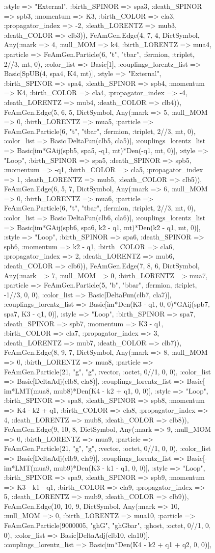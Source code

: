\documentclass{revtex4}
\begin{document}
\begin{figure}[!htb]
\begin{center}
{:style => "External", :birth_SPINOR => spa3, :death_SPINOR => spb3, :momentum => K3, :birth_COLOR => cla3, :propagator_index => -2, :death_LORENTZ => mub3, :death_COLOR => clb3)), FeAmGen.Edge(4, 7, 4, Dict{Symbol, Any}(:mark => 4, :null_MOM => k4, :birth_LORENTZ => mua4, :particle => FeAmGen.Particle(6, "t", "tbar", :fermion, :triplet, 2//3, mt, 0), :color_list => Basic[1], :couplings_lorentz_list => Basic[SpUB(4, spa4, K4, mt)], :style => "External", :birth_SPINOR => spa4, :death_SPINOR => spb4, :momentum => K4, :birth_COLOR => cla4, :propagator_index => -4, :death_LORENTZ => mub4, :death_COLOR => clb4)), FeAmGen.Edge(5, 6, 5, Dict{Symbol, Any}(:mark => 5, :null_MOM => 0, :birth_LORENTZ => mua5, :particle => FeAmGen.Particle(6, "t", "tbar", :fermion, :triplet, 2//3, mt, 0), :color_list => Basic[DeltaFun(clb5, cla5)], :couplings_lorentz_list => Basic[im*GAij(spb5, spa5, -q1, mt)*Den(-q1, mt, 0)], :style => "Loop", :birth_SPINOR => spa5, :death_SPINOR => spb5, :momentum => -q1, :birth_COLOR => cla5, :propagator_index => 1, :death_LORENTZ => mub5, :death_COLOR => clb5)), FeAmGen.Edge(6, 5, 7, Dict{Symbol, Any}(:mark => 6, :null_MOM => 0, :birth_LORENTZ => mua6, :particle => FeAmGen.Particle(6, "t", "tbar", :fermion, :triplet, 2//3, mt, 0), :color_list => Basic[DeltaFun(clb6, cla6)], :couplings_lorentz_list => Basic[im*GAij(spb6, spa6, k2 - q1, mt)*Den(k2 - q1, mt, 0)], :style => "Loop", :birth_SPINOR => spa6, :death_SPINOR => spb6, :momentum => k2 - q1, :birth_COLOR => cla6, :propagator_index => 2, :death_LORENTZ => mub6, :death_COLOR => clb6)), FeAmGen.Edge(7, 8, 6, Dict{Symbol, Any}(:mark => 7, :null_MOM => 0, :birth_LORENTZ => mua7, :particle => FeAmGen.Particle(5, "b", "bbar", :fermion, :triplet, -1//3, 0, 0), :color_list => Basic[DeltaFun(clb7, cla7)], :couplings_lorentz_list => Basic[im*Den(K3 - q1, 0, 0)*GAij(spb7, spa7, K3 - q1, 0)], :style => "Loop", :birth_SPINOR => spa7, :death_SPINOR => spb7, :momentum => K3 - q1, :birth_COLOR => cla7, :propagator_index => 3, :death_LORENTZ => mub7, :death_COLOR => clb7)), FeAmGen.Edge(8, 9, 7, Dict{Symbol, Any}(:mark => 8, :null_MOM => 0, :birth_LORENTZ => mua8, :particle => FeAmGen.Particle(21, "g", "g", :vector, :octet, 0//1, 0, 0), :color_list => Basic[DeltaAdj(clb8, cla8)], :couplings_lorentz_list => Basic[-im*LMT(mua8, mub8)*Den(K4 - k2 + q1, 0, 0)], :style => "Loop", :birth_SPINOR => spa8, :death_SPINOR => spb8, :momentum => K4 - k2 + q1, :birth_COLOR => cla8, :propagator_index => 4, :death_LORENTZ => mub8, :death_COLOR => clb8)), FeAmGen.Edge(9, 10, 8, Dict{Symbol, Any}(:mark => 9, :null_MOM => 0, :birth_LORENTZ => mua9, :particle => FeAmGen.Particle(21, "g", "g", :vector, :octet, 0//1, 0, 0), :color_list => Basic[DeltaAdj(clb9, cla9)], :couplings_lorentz_list => Basic[-im*LMT(mua9, mub9)*Den(K3 - k1 - q1, 0, 0)], :style => "Loop", :birth_SPINOR => spa9, :death_SPINOR => spb9, :momentum => K3 - k1 - q1, :birth_COLOR => cla9, :propagator_index => 5, :death_LORENTZ => mub9, :death_COLOR => clb9)), FeAmGen.Edge(10, 10, 9, Dict{Symbol, Any}(:mark => 10, :null_MOM => 0, :birth_LORENTZ => mua10, :particle => FeAmGen.Particle(9000005, "ghG", "ghGbar", :ghost, :octet, 0//1, 0, 0), :color_list => Basic[DeltaAdj(clb10, cla10)], :couplings_lorentz_list => Basic[im*Den(K4 - k2 + q1 + q2, 0, 0)], }
\end{center}
\end{figure}
\end{document}
